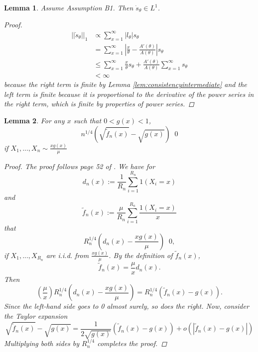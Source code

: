 \documentclass[11 pt]{article}
\newtheorem{lem}{Lemma}
\renewcommand{\th}{\theta}
\newcommand{\xra}[1]{\mathop{ \xrightarrow{#1} }}
\newcommand{\gs}{\frac{xg(x)}{\mu}}
\newcommand{\fnt}{\tilde{f}_n(x)}
\newcommand{\dsth}{\dot{s}_{\theta}}
\begin{document}
\begin{lem}
\label{lem:L1}
Assume Assumption B1. Then $\dsth \in L^1$. 
\begin{proof}
\begin{align*}
||\dsth||_1 &\propto \sum_{x=1}^{\infty} |l_{\th}| s_{\th} \\
&= \sum_{x=1}^{\infty} |\frac{x}{\th} - \frac{A'(\th)}{A(\th)}| s_{\th} \\
&\leq \sum_{x=1}^{\infty} \frac{x}{\th}s_{\th} + \frac{A'(\th)}{A(\th)}\sum_{x=1}^{\infty}s_{\th}  \\
&< \infty
\end{align*}
because the right term is finite by Lemma \ref{lem:consistencyintermediate} and the left term is finite because it is proportional to the derivative of the power series in the right term, which is finite by properties of power series. 
\end{proof}
\end{lem}




\begin{lem}{For any $x$ such that $0 < g(x) < 1$,
\[
n^{1/4} \left ( \sqrt{\fnt} - \sqrt{g(x)} \right) \xra{a.s.} 0
\]
if $X_1,...,X_n \sim \gs$
\label{lem:one}
}
\begin{proof}
The proof follows page 52 of \cite{disparity}. We have for
\[
d_n(x) := \frac{1}{R_n} \sum_{i = 1}^{R_n} 1(X_i = x)
\]
and
\[
\fnt := \frac{\mu}{R_n} \sum_{i = 1}^{R_n} \frac{1(X_i = x)}{x}
\]
that
\[
R_n^{1/4} \left ( d_n(x) - \gs  \right) \xra{a.s.} 0,
\]
if $X_1,...,X_{R_n}$ are i.i.d. from $\gs$. By the definition of $\fnt$,
\[
\fnt = \frac{\mu}{x} d_n(x).
\]
Then
\[
\left ( \frac{\mu}{x} \right ) R_n^{1/4} \left ( d_n(x) - \gs  \right) = R_n^{1/4} \left ( \fnt - g(x)  \right).
\]
Since the left-hand side goes to 0 almost surely, so does the right. Now, consider the Taylor expansion
\[
\sqrt{\fnt} - \sqrt{g(x)} = \frac{1}{2\sqrt{g(x)}} (\fnt - g(x)) + o(|\fnt - g(x)|)
\]
Multiplying both sides by $R_n^{1/4}$ completes the proof.
\end{proof}
\end{lem}
\end{document}
